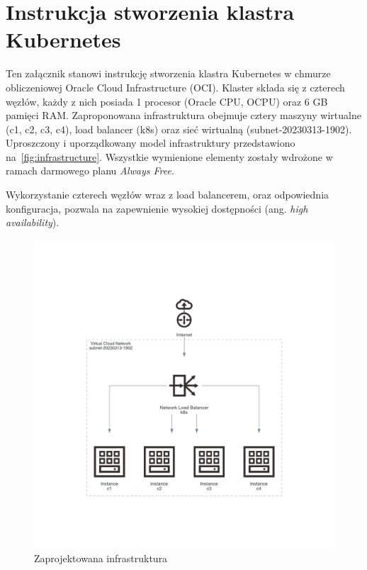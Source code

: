 \newpage

\section{Instrukcja stworzenia klastra Kubernetes}\label{sec:instrukcja-stworzenia-klastra-kubernetes}

Ten załącznik stanowi instrukcję stworzenia klastra Kubernetes w chmurze obliczeniowej Oracle Cloud Infrastructure (OCI).
Klaster składa się z czterech węzłów, każdy z nich posiada 1 procesor (Oracle CPU, OCPU) oraz 6 GB pamięci RAM\@.
Zaproponowana infrastruktura obejmuje cztery maszyny wirtualne (c1, c2, c3, c4), load balancer (k8s) oraz sieć wirtualną (subnet-20230313-1902).
Uproszczony i uporządkowany model infrastruktury przedstawiono na~\autoref{fig:infrastructure}.
Wszystkie wymienione elementy zostały wdrożone w ramach darmowego planu \emph{Always Free}.

Wykorzystanie czterech węzłów wraz z load balancerem, oraz odpowiednia konfiguracja, pozwala na zapewnienie wysokiej dostępności (ang. \emph{high availability}).

\begin{figure}[H]
    \centering
    \includegraphics[width=\textwidth]{img/oci-infrastructure}
    \caption{Zaprojektowana infrastruktura}
    \label{fig:infrastructure}
\end{figure}

